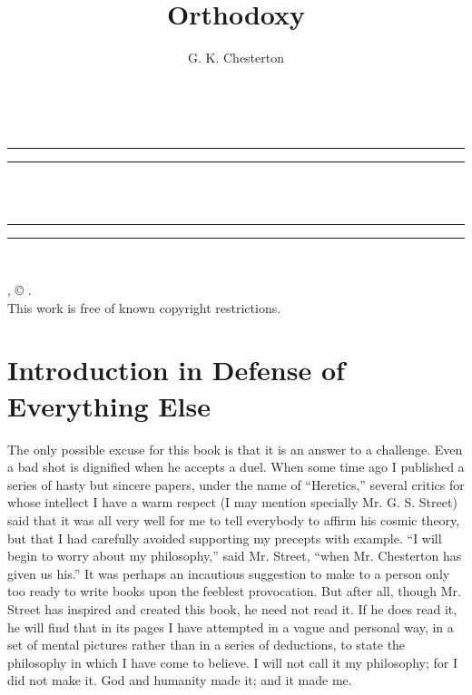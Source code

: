 \documentclass{book}
\date{}
\title{Orthodoxy}
\author{G. K. Chesterton}
\begin{document}
\thispagestyle{empty}
\begin{center}
	{\Huge \@title   \\[5mm]}
\end{center}
\newpage
\thispagestyle{empty}
\cleardoublepage
\begin{center}
	\thispagestyle{empty}
	\vspace*{\baselineskip}
	\rule{\textwidth}{1.6pt}\vspace*{-\baselineskip}\vspace*{2pt}
	\rule{\textwidth}{0.4pt}\\[\baselineskip]
	{\Huge\scshape \@title   \\[5mm]}
	{\Large }
	\rule{\textwidth}{0.4pt}\vspace*{-\baselineskip}\vspace{3.2pt}
	\rule{\textwidth}{1.6pt}\\[\baselineskip]
	\vspace*{4\baselineskip}
	{\Large \@author}
	\vfill
\end{center}
\pagebreak
\newpage
\thispagestyle{empty}
\null\vfill
\noindent
\begin{center}
	{\emph{\@title}, © \@author.\\[5mm]}
	{This work is free of known copyright restrictions.\\[5mm]}
\end{center}
\pagebreak
\newpage
\setcounter{tocdepth}{0}
\setcounter{secnumdepth}{0}

\chapter{Introduction in Defense of Everything Else}
\label{chapter-0}
The only possible excuse for this book is that it is an answer to a challenge. Even a bad shot is dignified when he accepts a duel. When some time ago I published a series of hasty but sincere papers, under the name of “Heretics,” several critics for whose intellect I have a warm respect (I may mention specially Mr. G. S. Street) said that it was all very well for me to tell everybody to affirm his cosmic theory, but that I had carefully avoided supporting my precepts with example. “I will begin to worry about my philosophy,” said Mr. Street, “when Mr. Chesterton has given us his.” It was perhaps an incautious suggestion to make to a person only too ready to write books upon the feeblest provocation. But after all, though Mr. Street has inspired and created this book, he need not read it. If he does read it, he will find that in its pages I have attempted in a vague and personal way, in a set of mental pictures rather than in a series of deductions, to state the philosophy in which I have come to believe. I will not call it my philosophy; for I did not make it. God and humanity made it; and it made me.
\end{document}
